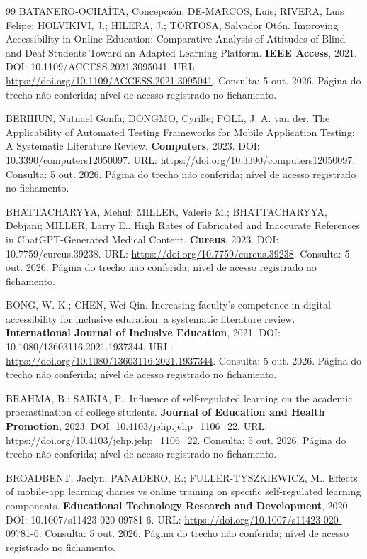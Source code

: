 \begin{thebibliography}{99}
 BATANERO-OCHAÍTA, Concepción; DE-MARCOS, Luis; RIVERA, Luis Felipe; HOLVIKIVI, J.; HILERA, J.; TORTOSA, Salvador Otón. Improving Accessibility in Online Education: Comparative Analysis of Attitudes of Blind and Deaf Students Toward an Adapted Learning Platform. \textbf{IEEE Access}, 2021. DOI: 10.1109/ACCESS.2021.3095041. URL: \url{https://doi.org/10.1109/ACCESS.2021.3095041}. Consulta: 5 out. 2026. Página do trecho não conferida; nível de acesso registrado no fichamento.

 BERIHUN, Natnael Gonfa; DONGMO, Cyrille; POLL, J. A. van der. The Applicability of Automated Testing Frameworks for Mobile Application Testing: A Systematic Literature Review. \textbf{Computers}, 2023. DOI: 10.3390/computers12050097. URL: \url{https://doi.org/10.3390/computers12050097}. Consulta: 5 out. 2026. Página do trecho não conferida; nível de acesso registrado no fichamento.

 BHATTACHARYYA, Mehul; MILLER, Valerie M.; BHATTACHARYYA, Debjani; MILLER, Larry E.. High Rates of Fabricated and Inaccurate References in ChatGPT-Generated Medical Content. \textbf{Cureus}, 2023. DOI: 10.7759/cureus.39238. URL: \url{https://doi.org/10.7759/cureus.39238}. Consulta: 5 out. 2026. Página do trecho não conferida; nível de acesso registrado no fichamento.

 BONG, W. K.; CHEN, Wei-Qin. Increasing faculty’s competence in digital accessibility for inclusive education: a systematic literature review. \textbf{International Journal of Inclusive Education}, 2021. DOI: 10.1080/13603116.2021.1937344. URL: \url{https://doi.org/10.1080/13603116.2021.1937344}. Consulta: 5 out. 2026. Página do trecho não conferida; nível de acesso registrado no fichamento.

 BRAHMA, B.; SAIKIA, P.. Influence of self-regulated learning on the academic procrastination of college students. \textbf{Journal of Education and Health Promotion}, 2023. DOI: 10.4103/jehp.jehp\_1106\_22. URL: \url{https://doi.org/10.4103/jehp.jehp_1106_22}. Consulta: 5 out. 2026. Página do trecho não conferida; nível de acesso registrado no fichamento.

 BROADBENT, Jaclyn; PANADERO, E.; FULLER-TYSZKIEWICZ, M.. Effects of mobile-app learning diaries vs online training on specific self-regulated learning components. \textbf{Educational Technology Research and Development}, 2020. DOI: 10.1007/s11423-020-09781-6. URL: \url{https://doi.org/10.1007/s11423-020-09781-6}. Consulta: 5 out. 2026. Página do trecho não conferida; nível de acesso registrado no fichamento.


\end{thebibliography}
